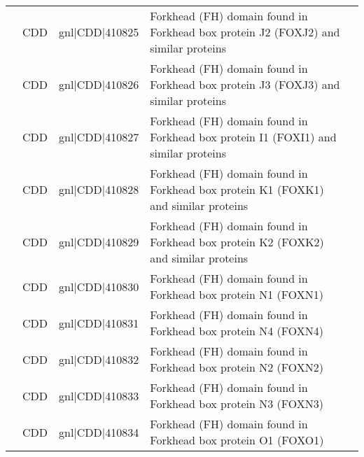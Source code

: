 \documentclass[../main.tex]{subfiles}
\begin{document}
\begin{landscape}
\begin{longtable}{@{}cllll@{}}
		                                & CDD                  & gnl|CDD|410825  & Forkhead (FH) domain found in Forkhead box protein J2 (FOXJ2) and similar proteins                                                           & \\
		                                & CDD                  & gnl|CDD|410826  & Forkhead (FH) domain found in Forkhead box protein J3 (FOXJ3) and similar proteins                                                           & \\
		                                & CDD                  & gnl|CDD|410827  & Forkhead (FH) domain found in Forkhead box protein I1 (FOXI1) and similar proteins                                                           & \\
		                                & CDD                  & gnl|CDD|410828  & Forkhead (FH) domain found in Forkhead box protein K1 (FOXK1) and similar proteins                                                           & \\
		                                & CDD                  & gnl|CDD|410829  & Forkhead (FH) domain found in Forkhead box protein K2 (FOXK2) and similar proteins                                                           & \\
		                                & CDD                  & gnl|CDD|410830  & Forkhead (FH) domain found in Forkhead box protein N1 (FOXN1)                                                                                & \\
		                                & CDD                  & gnl|CDD|410831  & Forkhead (FH) domain found in Forkhead box protein N4 (FOXN4)                                                                                & \\
		                                & CDD                  & gnl|CDD|410832  & Forkhead (FH) domain found in Forkhead box protein N2 (FOXN2)                                                                                & \\
		                                & CDD                  & gnl|CDD|410833  & Forkhead (FH) domain found in Forkhead box protein N3 (FOXN3)                                                                                & \\
		                                & CDD                  & gnl|CDD|410834  & Forkhead (FH) domain found in Forkhead box protein O1 (FOXO1)                                                                                & \\

\end{longtable}
\end{landscape}
\end{document}
